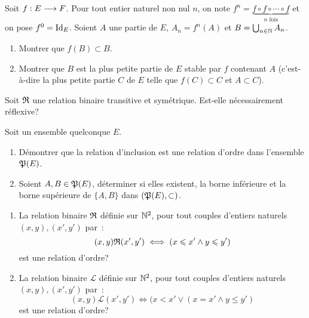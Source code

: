 \begin{exercice}
    Soit \(f:E \longrightarrow F\). Pour tout entier naturel non nul \(n\), on 
    note \(f^n = \underbrace{f \circ f \circ \cdots \circ f}_{n 
    \textrm{~fois}}\) et on pose \(f^0=\operatorname{Id}_E\). Soient \(A\) une partie de 
    \(E\), \(A_n=f^{n}(A)\) et \(B = \bigcup_{n\in \mathbb{N}} A_n\).
    \begin{enumerate}
        \item Montrer que \(f(B) \subset B\).
        \item Montrer que \(B\) est la plus petite partie de \(E\) stable par 
            \(f\) contenant \(A\) (c'est-à-dire la plus petite partie \(C\) de 
            \(E\) telle que \(f(C) \subset C\) et \(A \subset C\)).
    \end{enumerate}
\end{exercice}

\begin{exercice}
    Soit \(\mathfrak{R}\) une relation binaire transitive et symétrique. Est-elle 
    nécessairement réflexive?
\end{exercice}

\begin{exercice}
    Soit un ensemble quelconque \(E\).
    \begin{enumerate}
        \item Démontrer que la relation d'inclusion est une relation d'ordre 
            dans l'ensemble \(\mathfrak{P}(E)\).
        \item Soient \(A, B \in \mathfrak{P}(E)\), déterminer si elles existent, la 
            borne inférieure et la borne supérieure de \(\{A, B\}\) dans 
            \((\mathfrak{P}(E), \subset)\).
    \end{enumerate}
\end{exercice}

\begin{exercice}
    \begin{enumerate}
        \item La relation binaire \(\mathfrak{R}\) définie sur \(\mathbb{N}^2\), pour tout 
            couples d'entiers naturels \((x,y), (x',y')\) par~: 
            \[(x,y)\mathfrak{R}{}(x',y') \iff (x \leqslant x' \land y \leqslant y')\] 
            est une relation d'ordre?
        \item La relation binaire \(\mathcal{L}\) définie sur \(\mathbb{N}^2\), pour 
            tout couples d'entiers naturels \((x,y), (x',y')\) par~: 
            \[(x,y)\mathcal{L}(x',y') \iff (x < x' \lor (x=x' \land y \leqslant 
            y')\] est une relation d'ordre?
    \end{enumerate}
\end{exercice}
